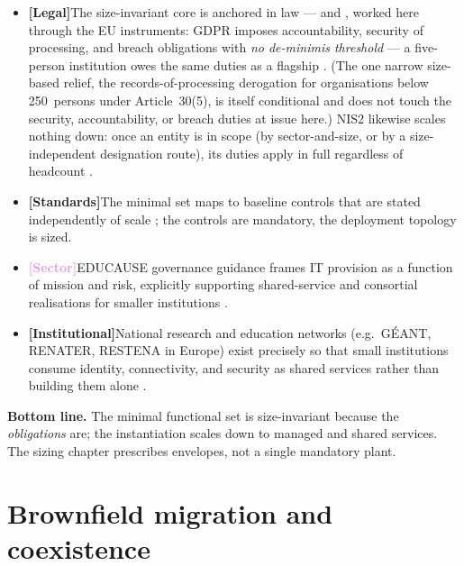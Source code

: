 \documentclass[11pt,a4paper,twoside]{book}
\let\citep\parencite
\newcommand{\institution}[1]{\textsc{#1}}
\newcommand{\evlegal}{\textcolor{BrickRed}{\textbf{[Legal]}}\space}
\newcommand{\evstd}{\textcolor{NavyBlue}{\textbf{[Standards]}}\space}
\newcommand{\evsector}{\textcolor{Plum}{\textbf{[Sector]}}\space}
\newcommand{\evinst}{\textcolor{Slate}{\textbf{[Institutional]}}\space}
\begin{document}
\begin{answerbox}[Response O3.1]
\begin{itemize}[leftmargin=1.4em,itemsep=2pt]
  \item \evlegal The size-invariant core is anchored in law ---
         and
        , worked here through the
        EU instruments: \institution{GDPR}
        imposes accountability, security of processing, and breach
        obligations with \emph{no de-minimis threshold} ---
        a five-person institution owes the same duties as a flagship
        \citep{gdpr}. (The one narrow size-based relief, the
        records-of-processing derogation for organisations below
        250~persons under Article~30(5), is itself conditional and does not
        touch the security, accountability, or breach duties at issue here.)
        \institution{NIS2} likewise scales nothing down: once an
        entity is in scope (by sector-and-size, or by a
        size-independent designation route), its duties apply in
        full regardless of headcount \citep{nis2}.
  \item \evstd The minimal set maps to baseline controls that are stated
        independently of scale \citep{nist-csf,iso27001,nist-zt}; the
        controls are mandatory, the deployment topology is sized.
  \item \evsector \institution{EDUCAUSE} governance guidance frames IT
        provision as a function of mission and risk, explicitly supporting
        shared-service and consortial realisations for smaller institutions
        \citep{educause-governance,educause-isg}.
  \item \evinst National research and education networks
        (e.g.\ \institution{GÉANT}, \institution{RENATER}, \institution{RESTENA}
        in Europe) exist precisely so that small institutions consume identity,
        connectivity, and security as shared services rather than building
        them alone \citep{geant,renater,restena,eduroam,edugain}.
\end{itemize}

\textbf{Bottom line.} The minimal functional set is size-invariant because
the \emph{obligations} are; the instantiation scales down to managed and
shared services. The sizing chapter prescribes envelopes, not a single
mandatory plant.
\end{answerbox}

\section{Brownfield migration and coexistence}
\label{sec:arg-migration}
\end{document}

